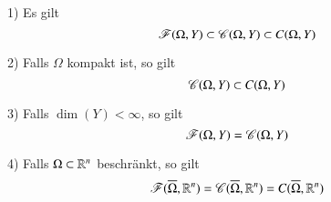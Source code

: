 \begin{remark}
    \begin{description}
        \item{1)}
        Es gilt
        \[
            \mathscr F(\Omega,Y)\subset \mathscr C(\Omega,Y)\subset C(\Omega,Y)
        \]
        \item{2)}
        Falls $\Omega$ kompakt ist, so gilt
        \[
            \mathscr C(\Omega,Y)\subset C(\Omega,Y)
        \]
        \item{3)}
        Falls $\dim(Y)<\infty$, so gilt
        \[
            \mathscr F(\Omega,Y)=\mathscr C(\Omega,Y)
        \]
        \item{4)}
        Falls $\Omega\subset\mathbb{R}^n$ beschränkt, so gilt
        \[
            \mathscr F (\overline \Omega,\mathbb{R}^n)=\mathscr C(\overline \Omega,\mathbb{R}^n)=C(\overline\Omega,\mathbb{R}^n)
        \]
    \end{description}
\end{remark}
